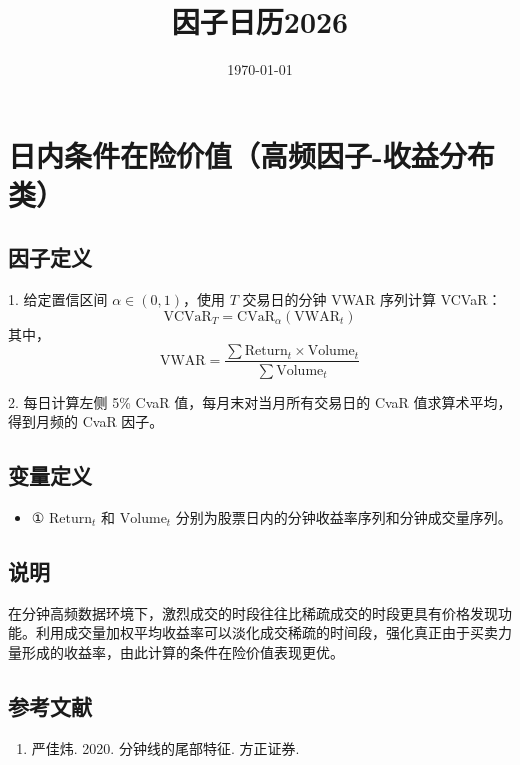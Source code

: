 \documentclass{article}
\title{因子日历2026}
\date{\today}
\begin{document}
\maketitle

\section{日内条件在险价值（高频因子-收益分布类）}

\subsection{因子定义}

1. 给定置信区间 \( \alpha \in (0, 1) \)，使用 \( T \) 交易日的分钟 VWAR 序列计算 VCVaR：
\begin{equation}
    \mathrm{VCVaR}_T = \mathrm{CVaR}_\alpha (\mathrm{VWAR}_t)
\end{equation}
其中，
\begin{equation}
    \mathrm{VWAR} = \frac{\sum \mathrm{Return}_t \times \mathrm{Volume}_t}{\sum \mathrm{Volume}_t}
\end{equation}

2. 每日计算左侧 5\% CvaR 值，每月末对当月所有交易日的 CvaR 值求算术平均，得到月频的 CvaR 因子。

\subsection{变量定义}
\begin{itemize}
    \item ① \( \mathrm{Return}_t \) 和 \( \mathrm{Volume}_t \) 分别为股票日内的分钟收益率序列和分钟成交量序列。
\end{itemize}

\subsection{说明}
在分钟高频数据环境下，激烈成交的时段往往比稀疏成交的时段更具有价格发现功能。利用成交量加权平均收益率可以淡化成交稀疏的时间段，强化真正由于买卖力量形成的收益率，由此计算的条件在险价值表现更优。

\subsection{参考文献}
\begin{enumerate}
    \item 严佳炜. 2020. 分钟线的尾部特征. 方正证券.
\end{enumerate}
\end{document}
